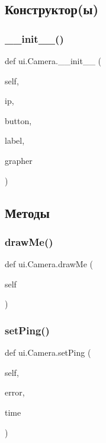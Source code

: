 \subsection{Конструктор(ы)}
\mbox{\label{classui_1_1_camera_a57b0a706f72ec8877414cf9f38d0200e}} 
\subsubsection{\texorpdfstring{\+\_\+\+\_\+init\+\_\+\+\_\+()}{\_\_init\_\_()}}
{\footnotesize\ttfamily def ui.\+Camera.\+\_\+\+\_\+init\+\_\+\+\_\+ (\begin{DoxyParamCaption}\item[{}]{self,  }\item[{}]{ip,  }\item[{}]{button,  }\item[{}]{label,  }\item[{}]{grapher }\end{DoxyParamCaption})}



\subsection{Методы}
\mbox{\label{classui_1_1_camera_a2eb0686a9ed44e4b3f464c333dafee8d}} 
\subsubsection{\texorpdfstring{draw\+Me()}{drawMe()}}
{\footnotesize\ttfamily def ui.\+Camera.\+draw\+Me (\begin{DoxyParamCaption}\item[{}]{self }\end{DoxyParamCaption})}

\mbox{\label{classui_1_1_camera_ab80e266281042190e7c8cd49fb04ec3c}} 
\subsubsection{\texorpdfstring{set\+Ping()}{setPing()}}
{\footnotesize\ttfamily def ui.\+Camera.\+set\+Ping (\begin{DoxyParamCaption}\item[{}]{self,  }\item[{}]{error,  }\item[{}]{time }\end{DoxyParamCaption})}



